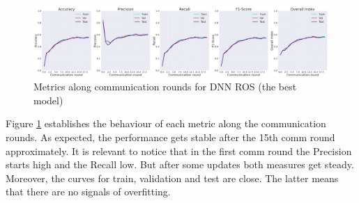 \begin{figure}[H]
\centering
\includegraphics[scale=0.4]{img/comm_round_metrics_DNNROS.png}
\caption{Metrics along communication rounds for DNN ROS (the best model)}
\label{fig:comm_round_metrics_DNNROS}
\end{figure}

Figure \ref{fig:comm_round_metrics_DNNROS} establishes the behaviour of each metric along the communication rounds. As expected, the performance gets stable after the 15th comm round approximately. It is relevant to notice that in the first comm round the Precision starts high and the Recall low. But after some updates both measures get steady. Moreover, the curves for train, validation and test are close. The latter means that there are no signals of overfitting.


